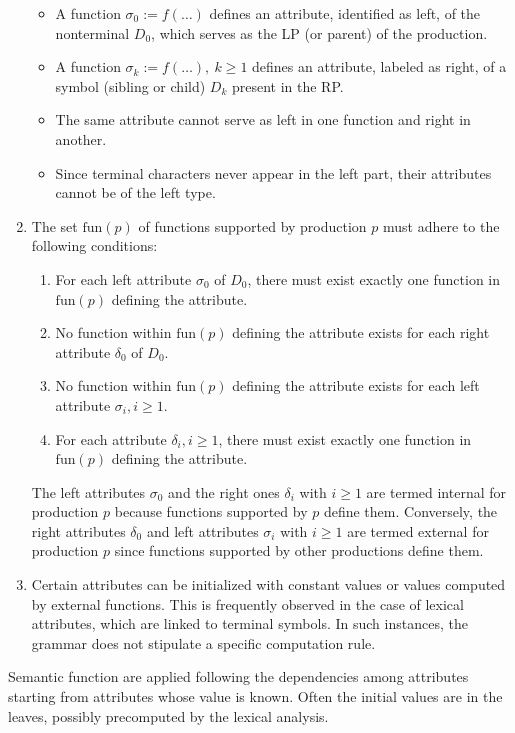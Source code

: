 \begin{enumerate}
\begin{itemize}
            \item A function $\sigma_0 := f(\ldots)$ defines an attribute, identified as left, of the nonterminal $D_0$, which serves as the LP (or parent) of the production.
            \item A function $\sigma_k := f(\ldots), \ k \geq 1$ defines an attribute, labeled as right, of a symbol (sibling or child) $D_k$ present in the RP.
            \item The same attribute cannot serve as left in one function and right in another.
            \item Since terminal characters never appear in the left part, their attributes cannot be of the left type.
        \end{itemize}
    \item The set $\text{fun}(p)$ of functions supported by production $p$ must adhere to the following conditions:
        \begin{enumerate}
            \item For each left attribute $\sigma_0$ of $D_0$, there must exist exactly one function in $\text{fun}(p)$ defining the attribute.
            \item No function within $\text{fun}(p)$ defining the attribute exists for each right attribute $\delta_0$ of $D_0$.
            \item No function within $\text{fun}(p)$ defining the attribute exists for each left attribute $\sigma_i, i \geq 1$.
            \item For each attribute $\delta_i, i \geq 1$, there must exist exactly one function in $\text{fun}(p)$ defining the attribute.
        \end{enumerate}
        The left attributes $\sigma_0$ and the right ones $\delta_i$ with $i \geq 1$ are termed internal for production $p$ because functions supported by $p$ define them. 
        Conversely, the right attributes $\delta_0$ and left attributes $\sigma_i$ with $i \geq 1$ are termed external for production $p$ since functions supported by other productions define them.    
    \item Certain attributes can be initialized with constant values or values computed by external functions. 
        This is frequently observed in the case of lexical attributes, which are linked to terminal symbols. 
        In such instances, the grammar does not stipulate a specific computation rule.
\end{enumerate}
Semantic function are applied following the dependencies among attributes starting from attributes whose value is known. 
Often the initial values are in the leaves, possibly precomputed by the lexical analysis. 

